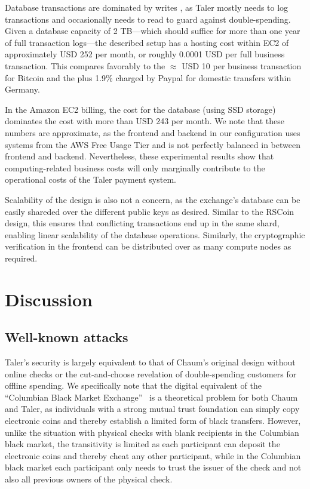 \documentclass[sigconf, authordraft]{acmart}
\begin{document}
Database transactions are dominated by writes%
, as Taler mostly needs to log
transactions and occasionally needs to read to guard against
double-spending.  Given a database capacity of 2 TB---which should
suffice for more than one year of full transaction logs---the
described setup has a hosting cost within EC2 of approximately USD 252
per month, or roughly 0.0001 USD per full business transaction.  This
compares favorably to the $\approx$ USD 10 per business transaction
for Bitcoin and the  plus 1.9\% charged by Paypal for
domestic transfers within Germany.

In the Amazon EC2 billing, the cost for the database (using SSD
storage) dominates the cost with more than USD 243 per month.  We note
that these numbers are approximate, as the frontend and backend in our
configuration uses systems from the AWS Free Usage Tier and is not
perfectly balanced in between frontend and backend.  Nevertheless,
these experimental results show that computing-related business costs
will only marginally contribute to the operational costs of the Taler
payment system.

Scalability of the design is also not a concern, as the exchange's
database can be easily shareded over the different public keys as
desired.  Similar to the RSCoin~\cite{danezis2016rscoin} design, this
ensures that conflicting transactions end up in the same shard,
enabling linear scalability of the database operations.  Similarly,
the cryptographic verification in the frontend can be distributed over
as many compute nodes as required.

\section{Discussion}

\subsection{Well-known attacks}

Taler's security is largely equivalent to that of Chaum's original
design without online checks or the cut-and-choose revelation of
double-spending customers for offline spending.
We specifically note that the digital equivalent of the ``Columbian
Black Market Exchange''~\cite{fatf1997} is a theoretical problem for
both Chaum and Taler, as individuals with a strong mutual trust
foundation can simply copy electronic coins and thereby establish a
limited form of black transfers.  However, unlike the situation with
physical checks with blank recipients in the Columbian black market,
the transitivity is limited as each participant can deposit the electronic
coins and thereby cheat any other participant, while in the Columbian
black market each participant only needs to trust the issuer of the
check and not also all previous owners of the physical check.
\end{document}
